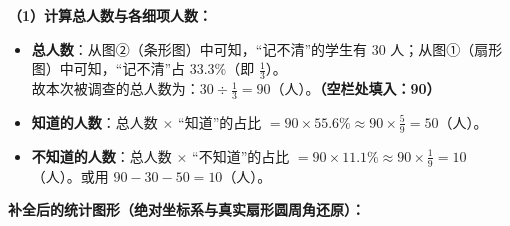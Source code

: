 \textbf{（1）计算总人数与各细项人数：}
\begin{itemize}
    \item \textbf{总人数}：从图②（条形图）中可知，“记不清”的学生有 $30$ 人；从图①（扇形图）中可知，“记不清”占 $33.3\%$（即 $\frac{1}{3}$）。\\
    故本次被调查的总人数为：$30 \div \frac{1}{3} = 90$（人）。\textbf{（空栏处填入：90）}
    \item \textbf{知道的人数}：总人数 $\times$ “知道”的占比 $= 90 \times 55.6\% \approx 90 \times \frac{5}{9} = 50$（人）。
    \item \textbf{不知道的人数}：总人数 $\times$ “不知道”的占比 $= 90 \times 11.1\% \approx 90 \times \frac{1}{9} = 10$（人）。或用 $90 - 30 - 50 = 10$（人）。
\end{itemize}

\textbf{补全后的统计图形（绝对坐标系与真实扇形圆周角还原）：}

